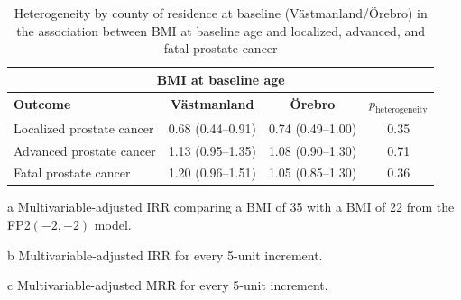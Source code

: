 \begin{table}[h]
\centering
\begin{threeparttable}
\caption[Heterogeneity by county of residence in the associations between BMI at baseline age and localized, advanced, and fatal prostate cancer]{Heterogeneity by county of residence at baseline (Västmanland/Örebro) in the association between BMI at baseline age and localized, advanced, and fatal prostate cancer}
\label{table:paper1_heterogeneity}
\begin{tabular}{lccc}
\hline
\multicolumn{4}{c}{{\bf BMI at baseline age}}                                                    \\ \hline
{\bf Outcome}             & {\bf Västmanland} & {\bf Örebro}      & $p_{\textrm{heterogeneity}}$ \\ \hline
Localized prostate cancer\tnote{a} & 0.68 (0.44--0.91)  & 0.74 (0.49--1.00) & 0.35                         \\
Advanced prostate cancer\tnote{b}  & 1.13 (0.95--1.35) & 1.08 (0.90--1.30) & 0.71                         \\
Fatal prostate cancer\tnote{c}     & 1.20 (0.96--1.51) & 1.05 (0.85--1.30) & 0.36                         \\ \hline
\end{tabular}
\begin{tablenotes}
\item [a] \footnotesize Multivariable-adjusted IRR comparing a BMI of 35 \kgmsq{} with a BMI of 22 \kgmsq{} from the FP2$(-2,-2)$ model.
\item [b] \footnotesize Multivariable-adjusted IRR for every 5-unit increment.
\item [c] \footnotesize Multivariable-adjusted MRR for every 5-unit increment.
\end{tablenotes}
\end{threeparttable}
\end{table}

